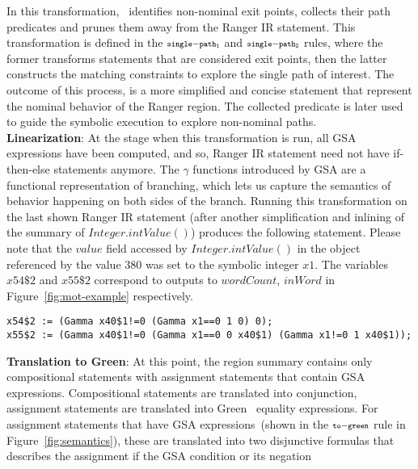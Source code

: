 In this transformation, \tool\ identifies non-nominal exit points, collects their path predicates and prunes them away
from the Ranger IR statement.
%
This transformation is defined in the $\scriptstyle\mathtt{single-path_1}$ and
$\scriptstyle\mathtt{single-path_2}$ rules, where the former transforms statements that are considered exit points, then the latter
constructs the matching constraints to explore the single path of interest.
%
The outcome of this process, is a more simplified and concise statement that represent the nominal behavior of the Ranger region.
%
The collected predicate is later used to guide the symbolic execution to explore non-nominal paths.\\
%
\textbf{Linearization}:
At the stage when this transformation is run, all GSA expressions have been computed, and so, Ranger IR statement
need not have if-then-else statements anymore.
%
The $\gamma$ functions introduced by GSA are a functional representation of branching, which lets us
capture the semantics of behavior happening on both sides of the branch.
%
Running this transformation on the last shown Ranger IR statement (after another simplification and inlining of the
summary of $Integer.intValue()$) produces the following statement.
%
Please note that the $value$ field accessed by $Integer.intValue()$ in the object referenced by the value
380 was set to the symbolic integer $x1$.
%
The variables $x54\$2$ and $x55\$2$ correspond to outputs to $wordCount$, $inWord$ in Figure~\ref{fig:mot-example} respectively.
\begin{lstlisting}[numbers=none]
x54$2 := (Gamma x40$1!=0 (Gamma x1==0 1 0) 0);
x55$2 := (Gamma x40$1!=0 (Gamma x1==0 0 x40$1) (Gamma x1!=0 1 x40$1));
\end{lstlisting}
\textbf{Translation to Green}:
%
At this point, the region summary contains only compositional statements with assignment statements that contain
GSA expressions.
%
Compositional statements are translated into conjunction, assignment statements are translated into Green~\cite{green}
equality expressions.
%
For assignment statements that have GSA expressions~(shown in the $\scriptstyle\mathtt{to-green}$ rule in Figure~\ref{fig:semantics}),
these are translated into two disjunctive formulas that describes the assignment if the GSA condition or its negation
